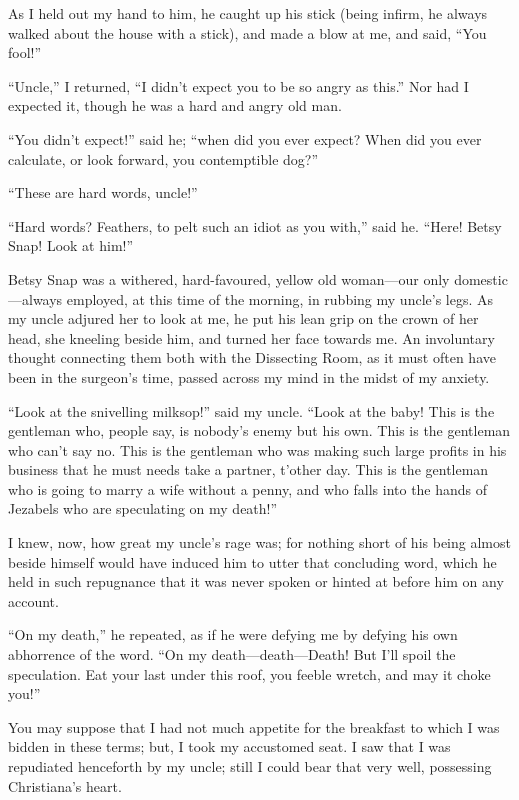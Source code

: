 As I held out my hand to him, he caught up his stick (being infirm,
he always walked about the house with a stick), and made a blow at
me, and said, ``You fool!''

``Uncle,'' I returned, ``I didn't expect you to be so angry as this.''
Nor had I expected it, though he was a hard and angry old man.

``You didn't expect!'' said he; ``when did you ever expect?  When did
you ever calculate, or look forward, you contemptible dog?''

``These are hard words, uncle!''

``Hard words?  Feathers, to pelt such an idiot as you with,'' said he.
``Here!  Betsy Snap!  Look at him!''

Betsy Snap was a withered, hard-favoured, yellow old woman---our only
domestic---always employed, at this time of the morning, in rubbing
my uncle's legs.  As my uncle adjured her to look at me, he put his
lean grip on the crown of her head, she kneeling beside him, and
turned her face towards me.  An involuntary thought connecting them
both with the Dissecting Room, as it must often have been in the
surgeon's time, passed across my mind in the midst of my anxiety.

``Look at the snivelling milksop!'' said my uncle.  ``Look at the baby!
This is the gentleman who, people say, is nobody's enemy but his
own.  This is the gentleman who can't say no.  This is the gentleman
who was making such large profits in his business that he must needs
take a partner, t'other day.  This is the gentleman who is going to
marry a wife without a penny, and who falls into the hands of
Jezabels who are speculating on my death!''

I knew, now, how great my uncle's rage was; for nothing short of his
being almost beside himself would have induced him to utter that
concluding word, which he held in such repugnance that it was never
spoken or hinted at before him on any account.

``On my death,'' he repeated, as if he were defying me by defying his
own abhorrence of the word.  ``On my death---death---Death!  But I'll
spoil the speculation.  Eat your last under this roof, you feeble
wretch, and may it choke you!''

You may suppose that I had not much appetite for the breakfast to
which I was bidden in these terms; but, I took my accustomed seat.
I saw that I was repudiated henceforth by my uncle; still I could
bear that very well, possessing Christiana's heart.

